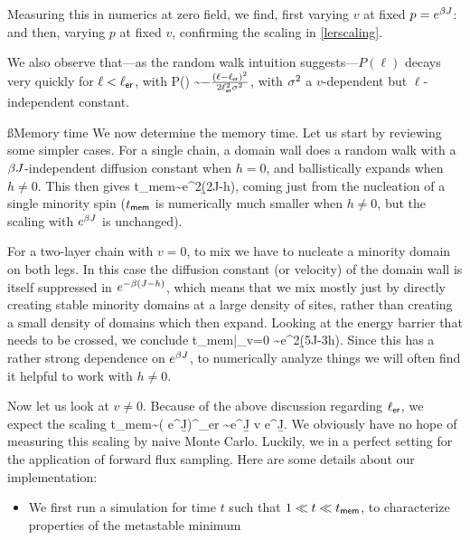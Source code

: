 \documentclass[12pt]{article}
\newcommand{\ler}{\ell_{\sf er}}
\newcommand{\tmem}{t_{\sf mem}}
\begin{document}
	Measuring this in numerics at zero field, we find, first varying $v$ at fixed $p= e^{\beta J}$: 
	\be {} \ee 
	and then, varying $p$ at fixed $v$, 
	\be {} \ee 
	confirming the scaling in \eqref{lerscaling}. 
	
	We also observe that---as the random walk intuition suggests---$P(\ell)$ decays very quickly for $\ell < \ler$, with 
	\be P(\ell) \sim \exp\( - \frac{(\ell - \ler)^2}{2\ler^2\s^2}\),\ee 
	with $\sigma^2$ a $v$-dependent but $\ell$-independent constant. 
	
	\ss*{Memory time} 
	We now determine the memory time. Let us start by reviewing some simpler cases. 	
	For a single chain, a domain wall does a random walk with a $\beta J$-independent diffusion constant when $h=0$, and ballistically expands when $h \neq 0$. This then gives 
	\be \tmem \sim e^{2\b(2J-h)},\ee 
	coming just from the nucleation of a single minority spin ($\tmem$ is numerically much smaller when $h\neq 0$, but the scaling with $e^{\beta J}$ is unchanged). 
	
	 For a two-layer chain with $v=0$, to mix we have to nucleate a minority domain on both legs. In this case the diffusion constant (or velocity) of the domain wall is itself suppressed in $e^{-\beta (J-h)}$, which means that we mix mostly just by directly creating stable minority domains at a large density of sites, rather than creating a small density of domains which then expand. Looking at the energy barrier that needs to be crossed, we conclude 
	 \be \tmem|_{v=0} \sim e^{2\b(5J-3h)}.\ee 
	 Since this has a rather strong dependence on $e^{\beta J}$, to numerically analyze things we will often find it helpful to work with $h\neq 0$. 
	
	Now let us look at $v\neq 0$. Because of the above discussion regarding $\ler$, we expect the scaling 
	\be \tmem \sim ( e^{\b J})^{\ler} \sim e^{\b J v e^{\b J}}.\ee 
	We obviously have no hope of measuring this scaling by naive Monte Carlo. Luckily, we in a perfect setting for the application of forward flux sampling. Here are some details about our implementation: 
	\begin{itemize}
		\item We first run a simulation for time $t$ such that $1 \ll t  \ll \tmem$, to characterize properties of the metastable minimum 
	\end{itemize}
	
\end{document}
